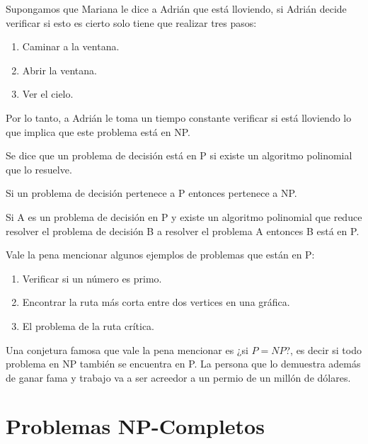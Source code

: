 \begin{eje}
Supongamos que Mariana le dice a Adrián que está lloviendo, si Adrián decide verificar si esto es cierto solo tiene que realizar tres pasos:
\begin{enumerate}
\item Caminar a la ventana.
\item Abrir la ventana.
\item Ver el cielo.
\end{enumerate}
Por lo tanto, a Adrián le toma un tiempo constante verificar si está lloviendo lo que implica que este problema está en NP.
\end{eje}
\begin{dfn}
Se dice que un problema de decisión está en P si existe un algoritmo polinomial que lo resuelve.
\end{dfn}
\begin{obs}[$P \subseteq NP$]
Si un problema de decisión pertenece a P entonces pertenece a NP.
\end{obs}
\begin{obs}
\label{pp eq}
Si A es un problema de decisión en P y existe un algoritmo polinomial que reduce resolver el problema de decisión B a resolver el problema A entonces B está en P.
\end{obs}

Vale la pena mencionar algunos ejemplos de problemas que están en P:
\begin{enumerate}
\item Verificar si un número es primo.
\item Encontrar la ruta más corta entre dos vertices en una gráfica.
\item El problema de la ruta crítica. 
\end{enumerate}

Una conjetura famosa que vale la pena mencionar es ¿si $P=NP$?, es decir si todo problema en NP también se encuentra en P. La persona que lo demuestra además de ganar fama y trabajo va a ser acreedor a un permio de un millón de dólares. 


\section{Problemas NP-Completos}

